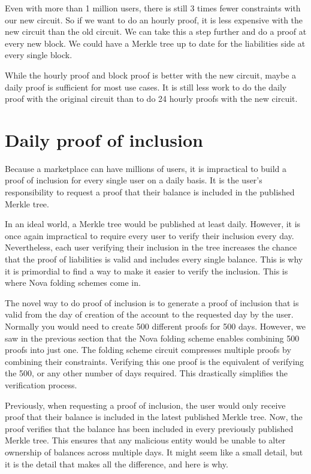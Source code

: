 Even with more than 1 million users, there is still 3 times fewer constraints with our new circuit.
So if we want to do an hourly proof, it is less expensive with the new circuit than the old circuit.
We can take this a step further and do a proof at every new block. We could have a Merkle tree up to date for the liabilities side at every single block.

While the hourly proof and block proof is better with the new circuit, maybe a daily proof is sufficient for most use cases.
It is still less work to do the daily proof with the original circuit than to do 24 hourly proofs with the new circuit. 

\section{Daily proof of inclusion}
Because a marketplace can have millions of users, it is impractical to build a proof of inclusion for every single user on a daily basis.
It is the user's responsibility to request a proof that their balance is included in the published Merkle tree.

In an ideal world, a Merkle tree would be published at least daily. However, it is once again impractical to require every user to verify their inclusion every day.
Nevertheless, each user verifying their inclusion in the tree increases the chance that the proof of liabilities is valid and includes every single balance.
This is why it is primordial to find a way to make it easier to verify the inclusion. This is where Nova folding schemes come in.

The novel way to do proof of inclusion is to generate a proof of inclusion that is valid from the day of creation of the account to the requested day by the user.
Normally you would need to create 500 different proofs for 500 days. However, we saw in the previous section that the Nova folding scheme enables combining 500 proofs into just one.
The folding scheme circuit compresses multiple proofs by combining their constraints.
Verifying this one proof is the equivalent of verifying the 500, or any other number of days required.
This drastically simplifies the verification process.

Previously, when requesting a proof of inclusion, the user would only receive proof that their balance is included in the latest published Merkle tree. Now, the proof verifies that the balance has been included in every previously published Merkle tree. 
This ensures that any malicious entity would be unable to alter ownership of balances across multiple days. It might seem like a small detail, but it is the detail that makes all the difference, and here is why.

